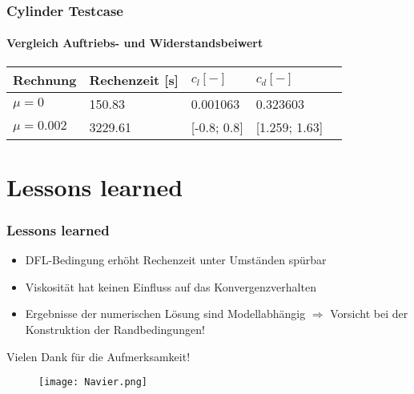 \documentclass[
	11pt, %
	aspectratio=169, %
]{beamer}
\begin{document}
\begin{frame}
	\frametitle{Cylinder Testcase}
	\framesubtitle{Vergleich Auftriebs- und Widerstandsbeiwert}

	\begin{table}
		\begin{tabular}{l l l l l}
			\toprule
			Rechnung & Rechenzeit [s]& $c_l [-]$  & $c_d [-]$\\
			\midrule
			$\mu = 0$ & 150.83 & 0.001063 & 0.323603\\
			$\mu = 0.002$& 3229.61 & [-0.8; 0.8] & [1.259; 1.63]\\
			\bottomrule
		\end{tabular}
	\end{table}
\end{frame}





 \section{Lessons learned}

 \begin{frame}
 	\frametitle{Lessons learned}

	\begin{itemize}
		\item DFL-Bedingung erhöht Rechenzeit unter Umständen spürbar
		\item Viskosität hat keinen Einfluss auf das Konvergenzverhalten
		\item Ergebnisse der numerischen Lösung sind Modellabhängig $\Rightarrow$ Vorsicht bei der Konstruktion der Randbedingungen! 
	\end{itemize}

 \end{frame}



\begin{frame} %
	 	\begin{center}
		
		\bigskip \bigskip %
		
		{\Large Vielen Dank für die Aufmerksamkeit!}
		\begin{figure}
			\texttt{[image: Navier.png]}
		\end{figure}
	\end{center}
 \end{frame}
\end{document}
